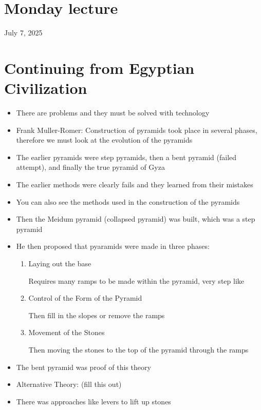 \documentclass{article}
\begin{document}
\maketitle

\section*{Monday lecture}
July 7, 2025

\section{Continuing from Egyptian Civilization}
\begin{itemize}
  \item There are problems and they must be solved with technology
  \item Frank Muller-Romer: Construction of pyramids took place in several phases,
    therefore we must look at the evolution of the pyramids
  \item The earlier pyramids were step pyramids, then a bent pyramid (failed attempt), and finally the true pyramid of Gyza
  \item The earlier methods were clearly fails and they learned from their mistakes
  \item You can also see the methods used in the construction of the pyramids
  \item Then the Meidum pyramid (collapsed pyramid) was built, which was a step pyramid
  \item He then proposed that pyaramids were made in three phases:
    \begin{enumerate}
      \item Laying out the base

        Requires many ramps to be made within the pyramid,
        very step like
      \item Control of the Form of the Pyramid

        Then fill in the slopes or remove the ramps
      \item Movement of the Stones

        Then moving the stones to the top of the pyramid through the ramps
    \end{enumerate}
  \item The bent pyramid was proof of this theory
  \item Alternative Theory: (fill this out)
  \item There was approaches like levers to lift up stones
\end{itemize}
\end{document}
